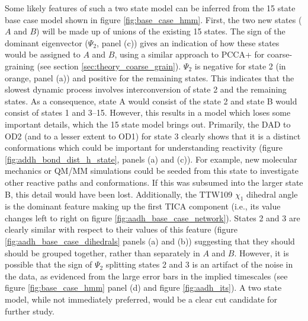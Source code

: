 Some likely features of such a two state model can be inferred from the \num{15} state base case model shown in figure \ref{fig:base_case_hmm}. First, the two new states ($A$ and $B$) will be made up of unions of the existing  \num{15} states.  The sign of the dominant eigenvector ($\Psi_{2}$, panel (c)) gives an indication of how these states would be assigned to $A$ and $B$, using a similar approach to PCCA+ for coarse-graining (see section \ref{sec:theory_coarse_grain}).  $\Psi_{2}$ is negative for state \num{2} (in orange, panel (a)) and positive for the remaining states. This indicates that the slowest dynamic process involves interconversion of state \num{2} and the remaining states.  As a consequence, state A would consist of the  state \num{2} and state B would consist of states \num{1} and \numrange{3}{15}.  However, this results in a model which loses some important details, which the 15 state model brings out. Primarily, the DAD to OD2 (and to a lesser extent to OD1) for state \num{3} clearly shows that it is a distinct conformations which could be important for understanding reactivity (figure \ref{fig:addh_bond_dist_h_state}, panels (a) and (c)). For example, new molecular mechanics or QM/MM simulations could be seeded from this state to investigate other reactive paths and conformations.  If this was subsumed into the larger state B, this detail would have been lost. Additionally, the  TTW109 $\chi_{1}$  dihedral angle is the dominant feature making up the first TICA component (i.e., its value changes left to right on figure \ref{fig:aadh_base_case_network}).  States \num{2} and \num{3} are clearly similar with respect to their values of this feature (figure \ref{fig:aadh_base_case_dihedrals} panels (a) and (b)) suggesting that they should should be grouped together, rather than separately in $A$ and $B$. However, it is possible that the sign of $\Psi_{2}$ splitting states \num{2} and \num{3} is an artifact of the noise in the data, as evidenced from the large error bars in the implied timescales (see figure \ref{fig:base_case_hmm} panel (d) and figure \ref{fig:aadh_its}). A two state model, while not immediately preferred, would be a clear cut candidate for further study. 


